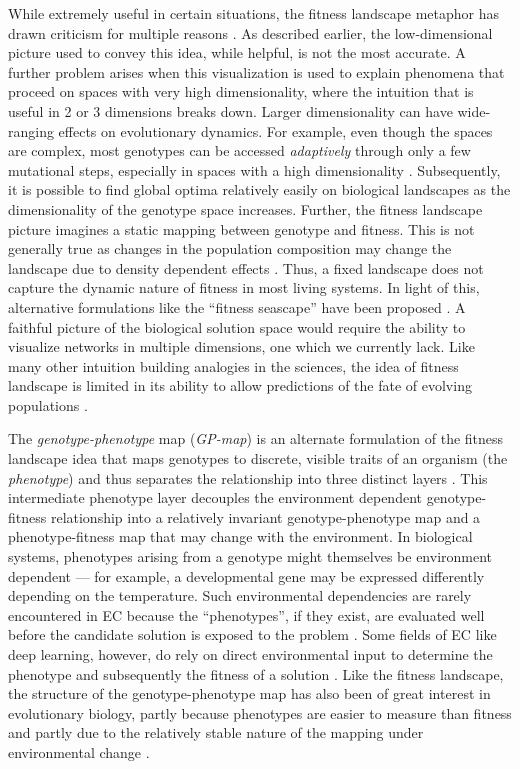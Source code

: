 While extremely useful in certain situations, the fitness landscape metaphor has drawn criticism for multiple reasons \citep{gavrilets1997evolution}.
As described earlier, the low-dimensional picture used to convey this idea, while helpful, is not the most accurate.
A further problem arises when this visualization is used to explain phenomena that proceed on spaces with very high dimensionality, where the intuition that is useful in 2 or 3 dimensions breaks down.
Larger dimensionality can have wide-ranging effects on evolutionary dynamics.
For example, even though the spaces are complex, most genotypes can be accessed \textit{adaptively} through only a few mutational steps, especially in spaces with a high dimensionality \citep{franke2011evolutionary}.
Subsequently, it is possible to find global optima relatively easily on biological landscapes as the dimensionality of the genotype space increases.
Further, the fitness landscape picture imagines a static mapping between genotype and fitness.
This is not generally true as changes in the population composition may change the landscape due to density dependent effects \citep{kaplan2008end}.
Thus, a fixed landscape does not capture the dynamic nature of fitness in most living systems.
In light of this, alternative formulations like the ``fitness seascape'' have been proposed \citep{cairns2022strong, mustonen2009fitness}.
A faithful picture of the biological solution space would require the ability to visualize networks in multiple dimensions, one which we currently lack.
Like many other intuition building analogies in the sciences, the idea of fitness landscape is limited in its ability to allow predictions of the fate of evolving populations \citep{achinstein1964models}.

The \textit{genotype-phenotype} map (\textit{GP-map}) is an alternate formulation of the fitness landscape idea that maps genotypes to discrete, visible traits of an organism (the \textit{phenotype}) and thus separates the relationship into three distinct layers \citep{ahnert2017structural, aguilar2018architecture}.
This intermediate phenotype layer decouples the environment dependent genotype-fitness relationship into a relatively invariant genotype-phenotype map and a phenotype-fitness map that may change with the environment.
In biological systems, phenotypes arising from a genotype might themselves be environment dependent --- for example, a developmental gene may be expressed differently depending on the temperature.
Such environmental dependencies are rarely encountered in EC because the ``phenotypes'', if they exist, are evaluated well before the candidate solution is exposed to the problem \citep{moczek2011role}.
Some fields of EC like deep learning, however, do rely on direct environmental input to determine the phenotype and subsequently the fitness of a solution  \citep{zhan2022evolutionary}.
Like the fitness landscape, the structure of the genotype-phenotype map has also been of great interest in evolutionary biology, partly because phenotypes are easier to measure than fitness and partly due to the relatively stable nature of the mapping under environmental change \citep{chen2022environmental, ahnert2017structural, wagner2011pleiotropic, aguilar2018architecture}.

